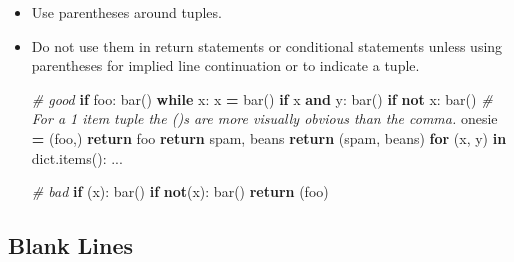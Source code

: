 \documentclass[
]{book}
\newenvironment{Shaded}{\begin{snugshade}}{\end{snugshade}}
\newcommand{\BuiltInTok}[1]{#1}
\newcommand{\CommentTok}[1]{\textcolor[rgb]{0.56,0.35,0.01}{\textit{#1}}}
\newcommand{\ControlFlowTok}[1]{\textcolor[rgb]{0.13,0.29,0.53}{\textbf{#1}}}
\newcommand{\KeywordTok}[1]{\textcolor[rgb]{0.13,0.29,0.53}{\textbf{#1}}}
\newcommand{\NormalTok}[1]{#1}
\newcommand{\OperatorTok}[1]{\textcolor[rgb]{0.81,0.36,0.00}{\textbf{#1}}}
\begin{document}
\begin{itemize}
\item
  Use parentheses around tuples.
\item
  Do not use them in return statements or conditional statements
  unless using parentheses for implied line continuation or to indicate a tuple.

\begin{Shaded}
\begin{Highlighting}[]
\CommentTok{# good}
\ControlFlowTok{if}\NormalTok{ foo:}
\NormalTok{    bar()}
\ControlFlowTok{while}\NormalTok{ x:}
\NormalTok{    x }\OperatorTok{=}\NormalTok{ bar()}
\ControlFlowTok{if}\NormalTok{ x }\KeywordTok{and}\NormalTok{ y:}
\NormalTok{    bar()}
\ControlFlowTok{if} \KeywordTok{not}\NormalTok{ x:}
\NormalTok{    bar()}
\CommentTok{# For a 1 item tuple the ()s are more visually obvious than the comma.}
\NormalTok{onesie }\OperatorTok{=}\NormalTok{ (foo,)}
\ControlFlowTok{return}\NormalTok{ foo}
\ControlFlowTok{return}\NormalTok{ spam, beans}
\ControlFlowTok{return}\NormalTok{ (spam, beans)}
\ControlFlowTok{for}\NormalTok{ (x, y) }\KeywordTok{in} \BuiltInTok{dict}\NormalTok{.items(): ...}

\CommentTok{# bad}
\ControlFlowTok{if}\NormalTok{ (x):}
\NormalTok{    bar()}
\ControlFlowTok{if} \KeywordTok{not}\NormalTok{(x):}
\NormalTok{    bar()}
\ControlFlowTok{return}\NormalTok{ (foo)}
\end{Highlighting}
\end{Shaded}
\end{itemize}

\hypertarget{blank-lines}{%
\subsection{Blank Lines}\label{blank-lines}}
\end{document}
